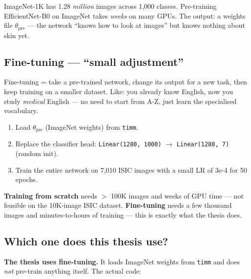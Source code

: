 \documentclass[11pt,a4paper]{article}
\begin{document}
\begin{example}
ImageNet-1K has 1.28 \textit{million} images across 1{,}000 classes. Pre-training EfficientNet-B0 on ImageNet takes \textit{weeks} on many GPUs. The output: a weights file $\theta_{\text{pre}}$ --- the network ``knows how to look at images'' but knows nothing about skin yet.
\end{example}

\subsection{Fine-tuning --- ``small adjustment''}

\begin{simple}
Fine-tuning = take a pre-trained network, change its output for a new task, then keep training on a smaller dataset. Like: you already know English, now you study \textit{medical} English --- no need to start from A-Z, just learn the specialised vocabulary.
\end{simple}

\begin{example}
\begin{enumerate}[leftmargin=*]
  \item Load $\theta_{\text{pre}}$ (ImageNet weights) from \texttt{timm}.
  \item Replace the classifier head: \texttt{Linear(1280, 1000)} $\to$ \texttt{Linear(1280, 7)} (random init).
  \item Train the entire network on 7{,}010 ISIC images with a small LR of 3e-4 for 50 epochs.
\end{enumerate}
\end{example}

\begin{idea}
\textbf{Training from scratch} needs $>$ 100K images and weeks of GPU time --- not feasible on the 10K-image ISIC dataset.
\textbf{Fine-tuning} needs a few thousand images and minutes-to-hours of training --- this is exactly what the thesis does.
\end{idea}

\subsection{Which one does this thesis use?}

\textbf{The thesis uses fine-tuning.} It loads ImageNet weights from \texttt{timm} and does \textit{not} pre-train anything itself. The actual code:
\end{document}
